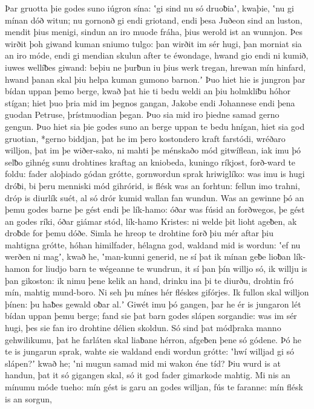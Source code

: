 Þar gruotta þie godes suno iúgron sína:
ʽgi sind nu só druoƀiaʼ, kwaþie, ʽnu gi mínan dóð witun;
nu gornonð gi endi griotand, endi þesa Juðeon sind an luston,
mendit þius menigi, sindun an iro muode fráha,
þius werold ist an wunnjon. Þes wirðit þoh giwand kuman
sniumo tulgo: þan wirðit im sér hugi,
þan morniat sia an iro móde, endi gi mendian skulun
after te éwondage, hwand gio endi ni kumið,
iuwes wellíƀes giwand: beþiu ne þurƀun iu þius werk tregan,
hrewan mín hinfard, hwand þanan skal þiu helpa kuman
gumono barnon.ʼ Þuo hiet hie is jungron þar
bídan uppan þemo berge, kwað þat hie ti bedu weldi
an þiu holmkliƀu hóhor stígan;
hiet þuo þria mid im þegnos gangan,
Jakobe endi Johannese endi þena guodan Petruse,
þrístmuodian þegan. Þuo sia mid iro þiedne samad
gerno gengun. Þuo hiet sia þie godes suno
an berge uppan te bedu hnígan,
hiet sia god gruotian, *gerno biddjan,
þat he im þero kostondero kraft farstódi,
wréðaro willjon, þat im þe wiðer-sako,
ni mahti þe ménskaðo mód gitwíflean,
iak imu þó selƀo gihnég sunu drohtines
kraftag an kniobeda, kuningo ríkjost,
forð-ward te foldu: fader aloþiado
gódan grótte, gornwordun sprak
hriwiglíko: was imu is hugi dróƀi,
bi þeru menniski mód gihrórid,
is flésk was an forhtun: fellun imo trahni,
dróp is diurlík suét, al só drór kumid
wallan fan wundun. Was an gewinne þó
an þemu godes barne þe gést endi þe lík-hamo:
óðar was fúsid an forðwegos,
þe gést an godes ríki, óðar giámar stód,
lík-hamo Kristes: ni welde þit lioht ageƀen,
ak droƀde for þemu dóðe. Simla he hreop te drohtine forð
þiu mér aftar þiu mahtigna grótte,
hóhan himilfader, hélagna god,
waldand mid is wordun: ʽef nu werðen ni magʼ, kwað he,
ʽman-kunni generid, ne sí þat ik mínan geƀe
lioƀan lík-hamon for liudjo barn
te wégeanne te wundrun, it sí þan þín willjo só,
ik willju is þan gikoston: ik nimu þene kelik an hand,
drinku ina þi te diurðu, drohtin fró mín,
mahtig mund-boro. Ni seh þu mínes hér
fléskes gifórjes. Ik fullon skal
willjon þínen: þu haƀes gewald oƀar al.ʼ
Giwét imu þó gangen, þar he ér is jungaron lét
bídan uppan þemu berge; fand sie þat barn godes
slápen sorgandie: was im sér hugi,
þes sie fan iro drohtine délien skoldun.
Só sind þat módþraka manno gehwilikumu,
þat he farláten skal liaƀane hérron,
afgeƀen þene só gódene. Þó he te is jungarun sprak,
wahte sie waldand endi wordun grótte:
ʽhwí willjad gi só slápen?ʼ kwað he; ʽni mugun samad mid mi
wakon éne tíd? Þiu wurd is at handun,
þat it só gigangen skal, só it god fader
gimarkode mahtig. Mi nis an mínumu móde tueho:
mín gést is garu an godes willjan,
fús te faranne: mín flésk is an sorgun,
